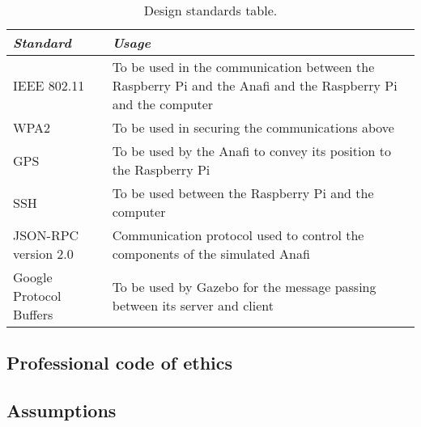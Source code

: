 \documentclass[../main.tex]{subfiles}
\begin{document}
\begin{table}[hbt!]
	\begin{tabular}{| P{2.2cm} | P{12.3cm} |}
		\hline 
		\textit{Standard} & \textit{Usage}\\ \hline
		IEEE 802.11 & To be used in the communication between the Raspberry Pi and the Anafi and the Raspberry Pi and the computer \\ \hline 
		
		WPA2 & To be used in securing the communications above \\ \hline
		
		GPS & To be used by the Anafi to convey its position to the Raspberry Pi \\ \hline 
		
		SSH & To be used between the Raspberry Pi and the computer \\ \hline
		
		JSON-RPC version 2.0 & Communication protocol used to control the components of the simulated Anafi \\ \hline 
		
		Google Protocol Buffers & To be used by Gazebo for the message passing between its server and client \\ \hline 
	\end{tabular}
	\caption{Design standards table.}
\end{table}\label{tab: design-standards}

\subsection{Professional code of ethics}

\blindtext

\subsection{Assumptions}

\blindtext
\end{document}
